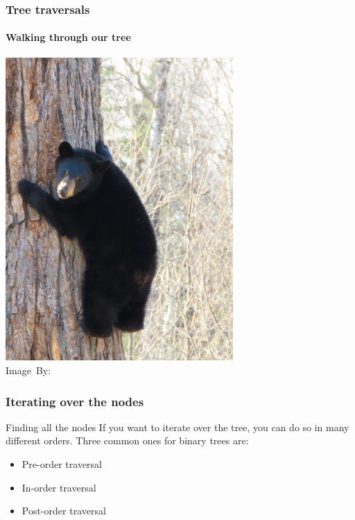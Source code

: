 \begin{frame}
	\frametitle{Tree traversals}
	\framesubtitle{Walking through our tree}

	\begin{center}
		\includegraphics[trim={0 4cm 0 4cm},clip, width=0.65\textwidth]{images/bearcub.jpg}\\
		\hspace*{15pt}\hbox{\scriptsize Image By:}
	\end{center}

\end{frame}

\begin{frame}
	\frametitle{Iterating over the nodes}
	
		\begin{block}{Finding all the nodes}
			If you want to iterate over the tree, you can do so in many different orders. Three common ones for binary trees are:
			\begin{itemize}
				\item Pre-order traversal
				\item In-order traversal
				\item Post-order traversal
			\end{itemize}
		\end{block}	
\end{frame}

